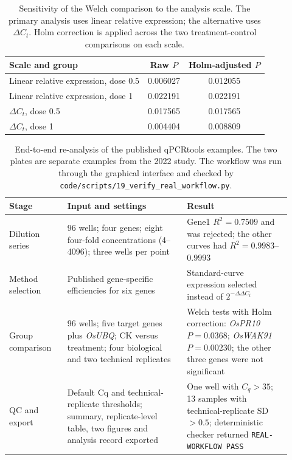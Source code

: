 \documentclass[11pt,a4paper]{article}
\begin{document}
\begin{table}[p]
\centering
\caption{Sensitivity of the Welch comparison to the analysis scale. The
primary analysis uses linear relative expression; the alternative uses
$\Delta C_t$. Holm correction is applied across the two treatment-control
comparisons on each scale.}
\label{tab:s2}
\small
\begin{tabular}{lcc}
\toprule
Scale and group & Raw $P$ & Holm-adjusted $P$ \\
\midrule
Linear relative expression, dose 0.5 & 0.006027 & 0.012055 \\
Linear relative expression, dose 1   & 0.022191 & 0.022191 \\
$\Delta C_t$, dose 0.5               & 0.017565 & 0.017565 \\
$\Delta C_t$, dose 1                 & 0.004404 & 0.008809 \\
\bottomrule
\end{tabular}
\end{table}

\begin{table}[p]
\centering
\caption{End-to-end re-analysis of the published qPCRtools examples.
The two plates are separate examples from the 2022 study. The workflow was
run through the graphical interface and checked by
\texttt{code/scripts/19\_verify\_real\_workflow.py}.}
\label{tab:s3}
\small
\begin{tabular}{@{}p{0.19\linewidth}p{0.39\linewidth}p{0.34\linewidth}@{}}
\toprule
Stage & Input and settings & Result \\
\midrule
Dilution series & 96 wells; four genes; eight four-fold concentrations
(4--4096); three wells per point & Gene1 $R^2 = 0.7509$ and was rejected;
the other curves had $R^2 = 0.9983$--$0.9993$ \\

Method selection & Published gene-specific efficiencies for six genes &
Standard-curve expression selected instead of
$2^{-\Delta\Delta C_t}$ \\

Group comparison & 96 wells; five target genes plus \textit{OsUBQ};
CK versus treatment; four biological and two technical replicates &
Welch tests with Holm correction: \textit{OsPR10} $P = 0.0368$;
\textit{OsWAK91} $P = 0.00230$; the other three genes were not significant \\

QC and export & Default Cq and technical-replicate thresholds; summary,
replicate-level table, two figures and analysis record exported &
One well with $C_q > 35$; 13 samples with technical-replicate
SD $> 0.5$; deterministic checker returned \texttt{REAL-WORKFLOW PASS} \\
\bottomrule
\end{tabular}
\end{table}
\end{document}
